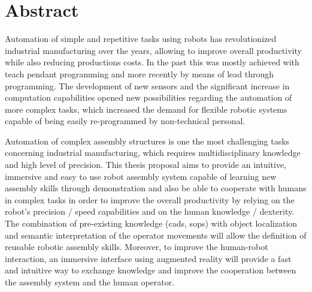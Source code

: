 \chapter*{Abstract}

Automation of simple and repetitive tasks using robots has revolutionized industrial manufacturing over the years, allowing to improve overall productivity while also reducing productions costs. In the past this was mostly achieved with teach pendant programming and more recently by means of lead through programming. The development of new sensors and the significant increase in computation capabilities opened new possibilities regarding the automation of more complex tasks, which increased the demand for flexible robotic systems capable of being easily re-programmed by non-technical personal.

Automation of complex assembly structures is one the most challenging tasks concerning industrial manufacturing, which requires multidisciplinary knowledge and high level of precision. This thesis proposal aims to provide an intuitive, immersive and easy to use robot assembly system capable of learning new assembly skills through demonstration and also be able to cooperate with humans in complex tasks in order to improve the overall productivity by relying on the robot's precision / speed capabilities and on the human knowledge / dexterity. The combination of pre-existing knowledge (\glspl{cad}, \glspl{sop}) with object localization and semantic interpretation of the operator movements will allow the definition of reusable robotic assembly skills. Moreover, to improve the human-robot interaction, an immersive interface using augmented reality will provide a fast and intuitive way to exchange knowledge and improve the cooperation between the assembly system and the human operator.
